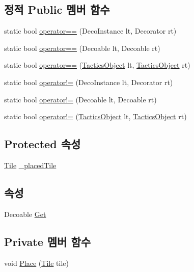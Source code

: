 \subsection*{정적 Public 멤버 함수}
\begin{DoxyCompactItemize}
\item 
static bool \hyperlink{class_m_c_n_1_1_deco_instance_abc697d911069827ae8ead07cd33ee2b9}{operator==} (Deco\+Instance lt, Decorator rt)
\item 
static bool \hyperlink{class_m_c_n_1_1_decoable_a6004bbc5f208c3031388c9d6e8f8359b}{operator==} (Decoable lt, Decoable rt)
\item 
static bool \hyperlink{class_tactics_object_a18f2979a4bf81dc755fbc17e425809f0}{operator==} (\hyperlink{class_tactics_object}{Tactics\+Object} lt, \hyperlink{class_tactics_object}{Tactics\+Object} rt)
\item 
static bool \hyperlink{class_m_c_n_1_1_deco_instance_a34da62189ea05cbf8e93d50b1132f306}{operator!=} (Deco\+Instance lt, Decorator rt)
\item 
static bool \hyperlink{class_m_c_n_1_1_decoable_aa75e4102ebd7265f577028b407534d27}{operator!=} (Decoable lt, Decoable rt)
\item 
static bool \hyperlink{class_tactics_object_a49e235618a22126faa6271243cd89710}{operator!=} (\hyperlink{class_tactics_object}{Tactics\+Object} lt, \hyperlink{class_tactics_object}{Tactics\+Object} rt)
\end{DoxyCompactItemize}
\subsection*{Protected 속성}
\begin{DoxyCompactItemize}
\item 
\hyperlink{class_tile}{Tile} \hyperlink{class_placeable_object_a0fd0566f0bb15c71b0630322762342d8}{\+\_\+placed\+Tile}
\end{DoxyCompactItemize}
\subsection*{속성}
\begin{DoxyCompactItemize}
\item 
Decoable \hyperlink{class_m_c_n_1_1_deco_instance_af02857ad80446cb4fdd1bf982bda95c5}{Get}
\end{DoxyCompactItemize}
\subsection*{Private 멤버 함수}
\begin{DoxyCompactItemize}
\item 
void \hyperlink{class_placeable_object_a06a30cf4396743908cc88733cb216df5}{Place} (\hyperlink{class_tile}{Tile} tile)
\end{DoxyCompactItemize}


